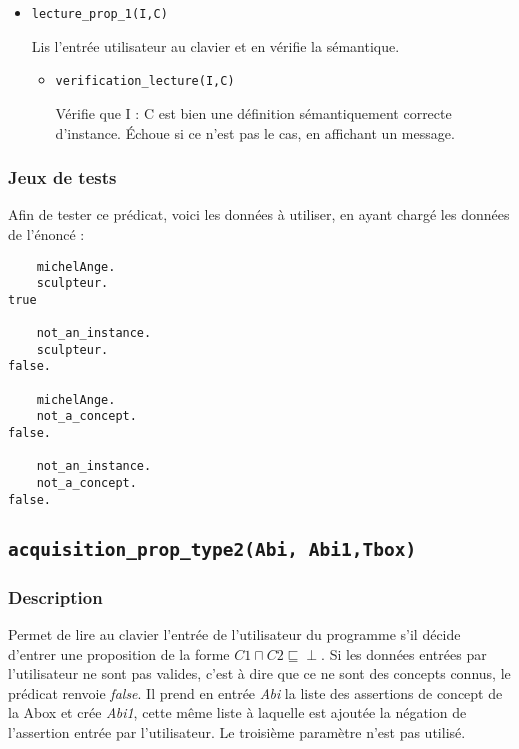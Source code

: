 \documentclass{article}
\newcommand{\code}[1]{\colorbox{light-gray}{\texttt{#1}}}
\begin{document}
\begin{itemize}

    \item \code{lecture\_prop\_1(I,C)}

    Lis l'entrée utilisateur au clavier et en vérifie la sémantique.
    
    \begin{itemize}
        \item \code{verification\_lecture(I,C)}

        Vérifie que I : C est bien une définition sémantiquement correcte d'instance. Échoue si ce n'est pas le cas, en affichant un message. 
    \end{itemize}
\end{itemize}

\subsubsection{Jeux de tests}

Afin de tester ce prédicat, voici les données à utiliser, en ayant chargé les données de l'énoncé :
\begin{verbatim}
    michelAnge.
    sculpteur.
true

    not_an_instance.
    sculpteur.
false.

    michelAnge.
    not_a_concept.
false.

    not_an_instance.
    not_a_concept.
false.
\end{verbatim}


\subsection{\code{acquisition\_prop\_type2(Abi, Abi1,Tbox)}}
\subsubsection{Description}

Permet de lire au clavier l'entrée de l'utilisateur du programme s'il décide d'entrer une proposition de la forme $C1 \sqcap C2 \sqsubseteq \perp$. Si les données entrées par l'utilisateur ne sont pas valides, c'est à dire que ce ne sont des concepts connus, le prédicat renvoie \textit{false}. Il prend en entrée \textit{Abi} la liste des assertions de concept de la Abox et crée \textit{Abi1}, cette même liste à laquelle est ajoutée la négation de l'assertion entrée par l'utilisateur. Le troisième paramètre n'est pas utilisé. 
\end{document}
